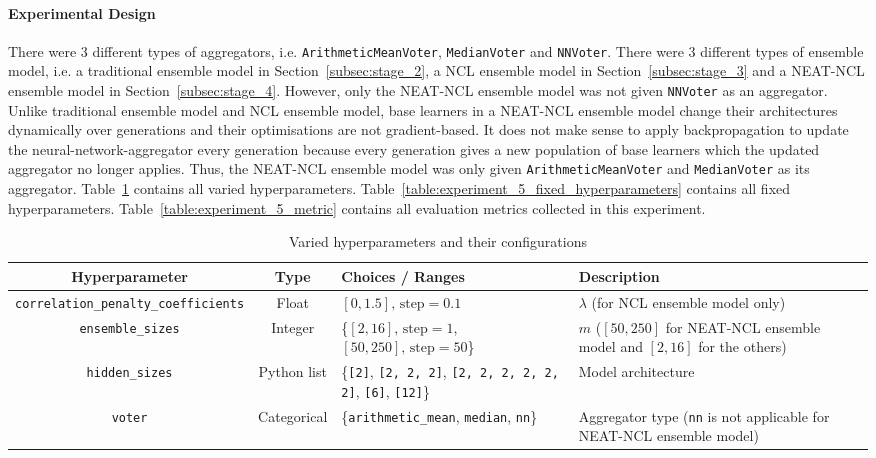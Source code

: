 \paragraph{Experimental Design}
There were 3 different types of aggregators, i.e. \texttt{ArithmeticMeanVoter}, \texttt{MedianVoter} and \texttt{NNVoter}. There were 3 different types of ensemble model, i.e. a traditional ensemble model in Section~\ref{subsec:stage_2}, a NCL ensemble model in Section~\ref{subsec:stage_3} and a NEAT-NCL ensemble model in Section~\ref{subsec:stage_4}. However, only the NEAT-NCL ensemble model was not given \texttt{NNVoter} as an aggregator. Unlike traditional ensemble model and NCL ensemble model, base learners in a NEAT-NCL ensemble model change their architectures dynamically over generations and their optimisations are not gradient-based. It does not make sense to apply backpropagation to update the neural-network-aggregator every generation because every generation gives a new population of base learners which the updated aggregator no longer applies. Thus, the NEAT-NCL ensemble model was only given \texttt{ArithmeticMeanVoter} and \texttt{MedianVoter} as its aggregator. Table~\ref{table:experiment_5_varied_hyperparameters} contains all varied hyperparameters. Table~\ref{table:experiment_5_fixed_hyperparameters} contains all fixed hyperparameters. Table~\ref{table:experiment_5_metric} contains all evaluation metrics collected in this experiment. 

\begin{table}[H]
    \centering
    \begin{tabular}{|c|c|p{3cm}|p{4cm}|}
        \hline
        Hyperparameter & Type & Choices / Ranges & Description \\
        \hline
        \small\texttt{correlation\_penalty\_coefficients} & Float & $[0, 1.5]\text{, step}=0.1$ & $\lambda$ (for NCL ensemble model only) \\
        \hline
        \small\texttt{ensemble\_sizes} & Integer & \{$[2, 16]\text{, step}=1$, $[50, 250]\text{, step}=50$\} & $m$ ($[50, 250]$ for NEAT-NCL ensemble model and $[2, 16]$ for the others) \\
        \hline
        \small\texttt{hidden\_sizes} & Python list & \{\texttt{[2]}, \texttt{[2, 2, 2]}, \texttt{[2, 2, 2, 2, 2, 2]}, \texttt{[6]}, \texttt{[12]}\} & Model architecture \\
        \hline
        \small\texttt{voter} & Categorical & \{\texttt{arithmetic\_mean}, \texttt{median}, \texttt{nn}\} & Aggregator type (\texttt{nn} is not applicable for NEAT-NCL ensemble model) \\
        \hline
    \end{tabular}
    \caption{Varied hyperparameters and their configurations}
    \label{table:experiment_5_varied_hyperparameters}
\end{table}

